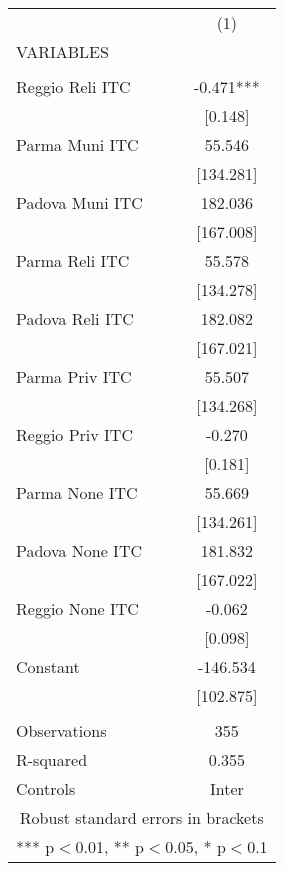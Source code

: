 \begin{tabular}{lc} \hline
 & (1) \\
VARIABLES &  \\ \hline
 &  \\
Reggio Reli ITC & -0.471*** \\
 & [0.148] \\
Parma Muni ITC & 55.546 \\
 & [134.281] \\
Padova Muni ITC & 182.036 \\
 & [167.008] \\
Parma Reli ITC & 55.578 \\
 & [134.278] \\
Padova Reli ITC & 182.082 \\
 & [167.021] \\
Parma Priv ITC & 55.507 \\
 & [134.268] \\
Reggio Priv ITC & -0.270 \\
 & [0.181] \\
Parma None ITC & 55.669 \\
 & [134.261] \\
Padova None ITC & 181.832 \\
 & [167.022] \\
Reggio None ITC & -0.062 \\
 & [0.098] \\
Constant & -146.534 \\
 & [102.875] \\
 &  \\
Observations & 355 \\
R-squared & 0.355 \\
 Controls & Inter \\ \hline
\multicolumn{2}{c}{ Robust standard errors in brackets} \\
\multicolumn{2}{c}{ *** p$<$0.01, ** p$<$0.05, * p$<$0.1} \\
\end{tabular}

